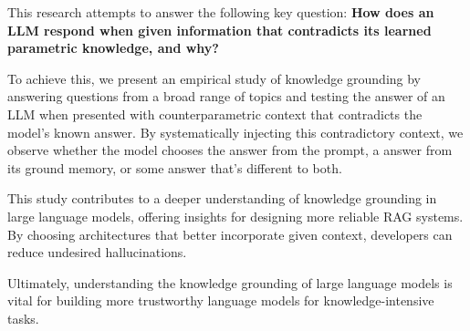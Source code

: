 This research attempts to answer the following key question: \textbf{How does an LLM respond when given information that contradicts its learned parametric knowledge, and why?}


To achieve this, we present an empirical study of knowledge grounding by answering questions from a broad range of topics and testing the answer of an LLM when presented with counterparametric context that contradicts the model's known answer.
By systematically injecting this contradictory context, we observe whether the model chooses the \Contextual{} answer from the prompt, a \Parametric{} answer from its ground memory, or some \Other{} answer that's different to both.


This study contributes to a deeper understanding of knowledge grounding in large language models, offering insights for designing more reliable RAG systems.
By choosing architectures that better incorporate given context, developers can reduce undesired hallucinations.

Ultimately, understanding the knowledge grounding of large language models is vital for building more trustworthy language models for knowledge-intensive tasks.

